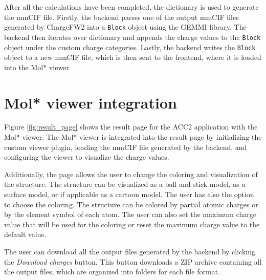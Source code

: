 \documentclass[
  digital,     %
  oneside,     %
  nosansbold,  %
  nocolorbold, %
  lof,         %
  lot,         %
]{fithesis4}
\begin{document}
After all the calculations have been completed, the dictionary is used to generate the mmCIF file. Firstly, the backend parses one of the output mmCIF files generated by ChargeFW2 into a \texttt{Block} object using the GEMMI library. The backend then iterates over dictionary and appends the charge values to the \texttt{Block} object under the custom charge categories. Lastly, the backend writes the \texttt{Block} object to a new mmCIF file, which is then sent to the frontend, where it is loaded into the Mol* viewer.

\section{Mol* viewer integration}
\label{section:viewer_integration}

Figure \ref{fig:result_page} shows the result page for the ACC2 application with the Mol* viewer. The Mol* viewer is integrated into the result page by initializing the custom viewer plugin, loading the mmCIF file generated by the backend, and configuring the viewer to visualize the charge values.

Additionally, the page allows the user to change the coloring and visualization of the structure. The structure can be visualized as a ball-and-stick model, as a surface model, or if applicable as a cartoon model. The user has also the option to choose the coloring. The structure can be colored by partial atomic charges or by the element symbol of each atom. The user can also set the maximum charge value that will be used for the coloring or reset the maximum charge value to the default value.

The user can download all the output files generated by the backend by clicking the \textit{Download charges} button. This button downloads a ZIP archive containing all the output files, which are organized into folders for each file format.
\end{document}
